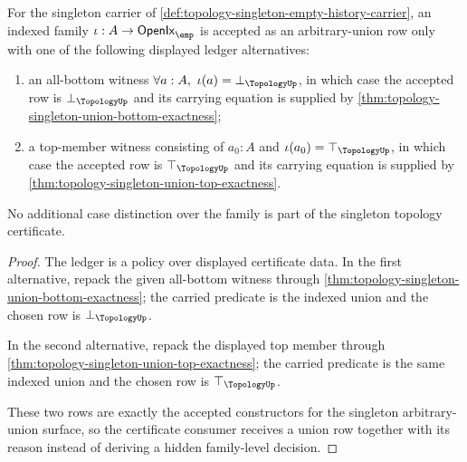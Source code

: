 \begin{theorem}
\label{thm:topology-singleton-union-case-split-ledger}
For the singleton carrier of \autoref{def:topology-singleton-empty-history-carrier}, an indexed family $\iota:A\to\mathsf{OpenIx}_{\emp}$ is accepted as an arbitrary-union row only with one of the following displayed ledger alternatives:
\begin{enumerate}
\item an all-bottom witness $\forall a:A,\ \iota(a)=\bot_{\TopologyUp}$, in which case the accepted row is $\bot_{\TopologyUp}$ and its carrying equation is supplied by \autoref{thm:topology-singleton-union-bottom-exactness};
\item a top-member witness consisting of $a_0:A$ and $\iota(a_0)=\top_{\TopologyUp}$, in which case the accepted row is $\top_{\TopologyUp}$ and its carrying equation is supplied by \autoref{thm:topology-singleton-union-top-exactness}.
\end{enumerate}
No additional case distinction over the family is part of the singleton topology certificate.
\end{theorem}
\begin{proof}
The ledger is a policy over displayed certificate data. In the first alternative, repack the given all-bottom witness through \autoref{thm:topology-singleton-union-bottom-exactness}; the carried predicate is the indexed union and the chosen row is $\bot_{\TopologyUp}$.

In the second alternative, repack the displayed top member through \autoref{thm:topology-singleton-union-top-exactness}; the carried predicate is the same indexed union and the chosen row is $\top_{\TopologyUp}$.

These two rows are exactly the accepted constructors for the singleton arbitrary-union surface, so the certificate consumer receives a union row together with its reason instead of deriving a hidden family-level decision.
\end{proof}

